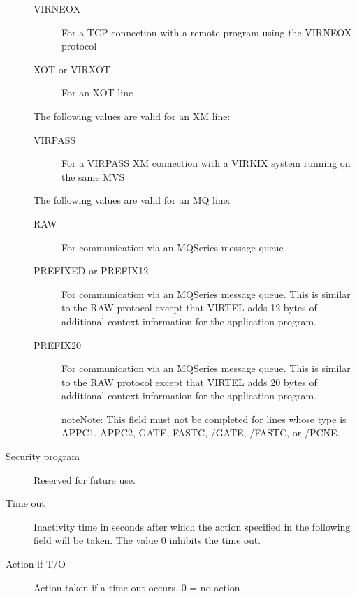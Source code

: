 \documentclass[letterpaper,10pt,english]{sphinxmanual}
\begin{document}
\begin{description}
\begin{description}
\item[{VIRNEOX}] \leavevmode
For a TCP connection with a remote program using the VIRNEOX
protocol

\item[{XOT or VIRXOT}] \leavevmode
For an XOT line

\end{description}

The following values are valid for an XM line:
\begin{description}
\item[{VIRPASS}] \leavevmode
For a VIRPASS XM connection with a VIRKIX system running on the same MVS

\end{description}

The following values are valid for an MQ line:
\begin{description}
\item[{RAW}] \leavevmode
For communication via an MQSeries message queue

\item[{PREFIXED or PREFIX12}] \leavevmode
For communication via an MQSeries message queue. This is similar to
the RAW protocol except that VIRTEL adds 12 bytes of additional
context information for the application program.

\item[{PREFIX20}] \leavevmode
For communication via an MQSeries message queue. This is similar to
the RAW protocol except that VIRTEL adds 20 bytes of additional
context information for the application program.

\begin{sphinxadmonition}{note}{Note:}
This field must not be completed for lines whose type is APPC1, APPC2, GATE, FASTC, /GATE, /FASTC, or /PCNE.
\end{sphinxadmonition}

\end{description}

\item[{Security program}] \leavevmode
Reserved for future use.

\item[{Time out}] \leavevmode
Inactivity time in seconds after which the action specified in the
following field will be taken. The value 0 inhibits the time out.

\item[{Action if T/O}] \leavevmode
Action taken if a time out occurs. 0 = no action


\end{description}
\end{document}
